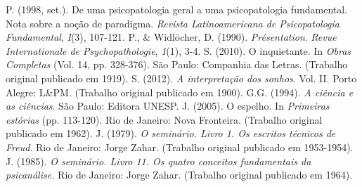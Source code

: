 \begin{multicols}{2}
\begin{scieloReferencesContainer}[Referências]
\allowbreak{} P.\allowbreak{} (\allowbreak{}1998,\allowbreak{} set.\allowbreak{})\allowbreak{}.\allowbreak{} De uma psicopatologia geral a uma psicopatologia fundamental.\allowbreak{} Nota sobre a noção de paradigma.\allowbreak{} \textit{Revista Latinoamericana de Psicopatologia Fundamental},\allowbreak{} \textit{I}(\allowbreak{}3)\allowbreak{},\allowbreak{} 107-\allowbreak{}121.\allowbreak{}
\allowbreak{} P.\allowbreak{},\allowbreak{} \&\allowbreak{\allowbreak{}\allowbreak{}}\allowbreak{} Widlöcher,\allowbreak{} D.\allowbreak{} (\allowbreak{}1990)\allowbreak{}.\allowbreak{} \textit{Présentation}.\allowbreak{} \textit{Revue Internationale de Psychopathologie},\allowbreak{} \textit{1}(\allowbreak{}1)\allowbreak{},\allowbreak{} 3-\allowbreak{}4.\allowbreak{}
\allowbreak{} S.\allowbreak{} (\allowbreak{}2010)\allowbreak{}.\allowbreak{} O inquietante.\allowbreak{} In \textit{Obras Completas} (\allowbreak{}Vol.\allowbreak{} 14,\allowbreak{} pp.\allowbreak{} 328-\allowbreak{}376)\allowbreak{}.\allowbreak{} São Paulo:\allowbreak{} Companhia das Letras.\allowbreak{} (\allowbreak{}Trabalho original publicado em 1919)\allowbreak{}.\allowbreak{}
\allowbreak{} S.\allowbreak{} (\allowbreak{}2012)\allowbreak{}.\allowbreak{} \textit{A interpretação dos sonhos}.\allowbreak{} Vol.\allowbreak{} II.\allowbreak{} Porto Alegre:\allowbreak{} L\&\allowbreak{\allowbreak{}\allowbreak{}}\allowbreak{}PM.\allowbreak{} (\allowbreak{}Trabalho original publicado em 1900)\allowbreak{}.\allowbreak{}
\allowbreak{} G.\allowbreak{}G.\allowbreak{} (\allowbreak{}1994)\allowbreak{}.\allowbreak{} \textit{A ciência e as ciências}.\allowbreak{} São Paulo:\allowbreak{} Editora UNESP.\allowbreak{}
\allowbreak{} J.\allowbreak{} (\allowbreak{}2005)\allowbreak{}.\allowbreak{} O espelho.\allowbreak{} In \textit{Primeiras estórias }(\allowbreak{}pp.\allowbreak{} 113-\allowbreak{}120)\allowbreak{}.\allowbreak{} Rio de Janeiro:\allowbreak{} Nova Fronteira.\allowbreak{} (\allowbreak{}Trabalho original publicado em 1962)\allowbreak{}.\allowbreak{}
\allowbreak{} J.\allowbreak{} (\allowbreak{}1979)\allowbreak{}.\allowbreak{} \textit{O seminário.\allowbreak{} Livro 1.\allowbreak{} Os escritos técnicos de Freud}.\allowbreak{} Rio de Janeiro:\allowbreak{} Jorge Zahar.\allowbreak{} (\allowbreak{}Trabalho original publicado em 1953-\allowbreak{}1954)\allowbreak{}.\allowbreak{}
\allowbreak{} J.\allowbreak{} (\allowbreak{}1985)\allowbreak{}.\allowbreak{} \textit{O seminário.\allowbreak{} Livro 11.\allowbreak{} Os quatro conceitos fundamentais da psicanálise.\allowbreak{}} Rio de Janeiro:\allowbreak{} Jorge Zahar.\allowbreak{} (\allowbreak{}Trabalho original publicado em 1964)\allowbreak{}.\allowbreak{}

\end{scieloReferencesContainer}
\end{multicols}
